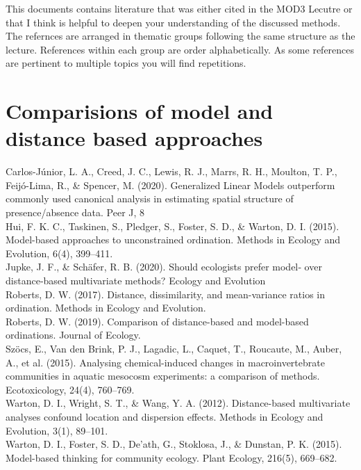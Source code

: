 \documentclass{article}
\begin{document}
This documents contains literature that was either cited in the MOD3 Lecutre or that I think is helpful to deepen your understanding of the discussed methods. The refernces are arranged in thematic groups following the same structure as the lecture. References within each group are order alphabetically. As some references are pertinent to multiple topics you will find repetitions. 
\section{Comparisions of model and distance based approaches}
Carlos-Júnior, L. A., Creed, J. C., Lewis, R. J., Marrs, R. H., Moulton, T. P., Feijó-Lima, R., \& Spencer, M. (2020). Generalized Linear Models outperform commonly used canonical analysis in estimating spatial structure of presence/absence data. Peer J, 8 \\

Hui, F. K. C., Taskinen, S., Pledger, S., Foster, S. D., \& Warton, D. I. (2015). Model-based approaches to unconstrained ordination. Methods in Ecology and Evolution, 6(4), 399–411. \\

Jupke, J. F., \& Schäfer, R. B. (2020). Should ecologists prefer model‐ over distance‐based multivariate methods? Ecology and Evolution\\

Roberts, D. W. (2017). Distance, dissimilarity, and mean-variance ratios in ordination. Methods in Ecology and Evolution. \\

Roberts, D. W. (2019). Comparison of distance-based and model-based ordinations. Journal of Ecology. \\

Szöcs, E., Van den Brink, P. J., Lagadic, L., Caquet, T., Roucaute, M., Auber, A., et al. (2015). Analysing chemical-induced changes in macroinvertebrate communities in aquatic mesocosm experiments: a comparison of methods. Ecotoxicology, 24(4), 760–769.\\ 

Warton, D. I., Wright, S. T., \& Wang, Y. A. (2012). Distance-based multivariate analyses confound location and dispersion effects. Methods in Ecology and Evolution, 3(1), 89–101.  \\

Warton, D. I., Foster, S. D., De’ath, G., Stoklosa, J., \& Dunstan, P. K. (2015). Model-based thinking for community ecology. Plant Ecology, 216(5), 669–682. \\
\end{document}
